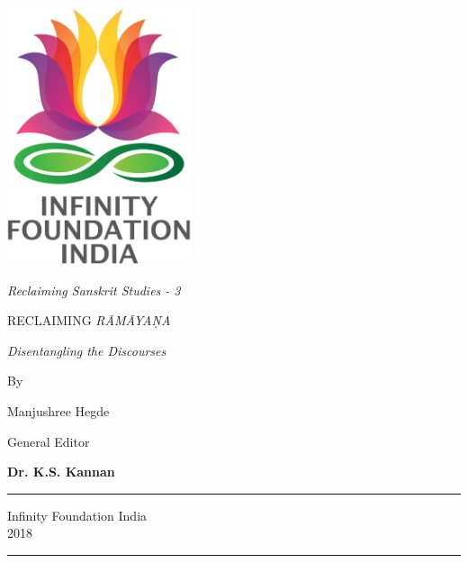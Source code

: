 \thispagestyle{empty}
\begin{center}
\includegraphics[scale=0.3]{figures/logo.png}
\bigskip

{\fontsize{10}{14}\selectfont\sl
Reclaiming Sanskrit Studies - 3}
\end{center}
\bigskip

\begin{center}
{\fontsize{20}{24}\selectfont RECLAIMING {\sl RĀMĀYAṆA}}\\[6pt]
\bigskip

{{\fontsize{17}{20}\selectfont\sl Disentangling the Discourses}}

\vfill

{\fontsize{12}{14}\selectfont 
By\par
}

{\fontsize{14}{18}\selectfont 
Manjushree Hegde\par
}

\bigskip
\bigskip

{\fontsize{12}{14}\selectfont 
General Editor\par
}

{\fontsize{14}{18}\selectfont 
{\bf Dr. K.S. Kannan}\par
}
\vfill

\rule{5cm}{1pt}

{\fontsize{12}{14}\selectfont
Infinity Foundation India\\[4pt]
2018}

\rule{5cm}{1pt}
\end{center}




